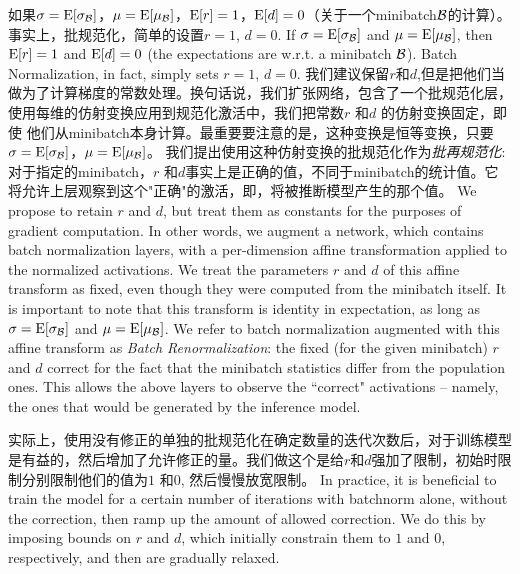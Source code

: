 如果$\sigma = \mathrm{E}[\sigma_{\mathcal{B}}]$，$\mu=\mathrm{E}[\mu_{\mathcal{B}}]$，$\mathrm{E}[r] = 1$，$\mathrm{E}[d] = 0$（关于一个minibatch$\mathcal{B}$的计算）。事实上，批规范化，简单的设置$r=1$, $d=0$.
If  $\sigma = \mathrm{E}[\sigma_{\mathcal{B}}]$ and $\mu=\mathrm{E}[\mu_{\mathcal{B}}]$, then $\mathrm{E}[r] = 1$ and $\mathrm{E}[d] = 0$  (the expectations are w.r.t. a minibatch $\mathcal{B}$). Batch Normalization, in fact, simply sets $r=1$, $d=0$.
我们建议保留$r$和$d$,但是把他们当做为了计算梯度的常数处理。换句话说，我们扩张网络，包含了一个批规范化层，使用每维的仿射变换应用到规范化激活中，我们把常数$r$ 和$d$ 的仿射变换固定，即使
他们从minibatch本身计算。最重要要注意的是，这种变换是恒等变换，只要$\sigma = \mathrm{E}[\sigma_{\mathcal{B}}]$，$\mu=\mathrm{E}[\mu_{\mathcal{B}}]$。
我们提出使用这种仿射变换的批规范化作为{\em 批再规范化}:对于指定的minibatch，$r$ 和$d$事实上是正确的值，不同于minibatch的统计值。它将允许上层观察到这个"正确"的激活，即，将被推断模型产生的那个值。
We propose to retain $r$ and $d$, but treat them as constants for the purposes of gradient computation. In other words, we augment a  network, which contains batch normalization layers, with a per-dimension affine transformation applied to the normalized activations. We treat the parameters $r$ and $d$ of this affine transform as fixed, even though they were computed from the minibatch itself. It is important to note that this transform  is identity in expectation, as long as  $\sigma = \mathrm{E}[\sigma_{\mathcal{B}}]$ and $\mu=\mathrm{E}[\mu_{\mathcal{B}}]$. We refer to batch normalization augmented with this affine transform as {\em Batch Renormalization}: the fixed (for the given minibatch) $r$ and $d$ correct for the fact that the minibatch statistics differ from the population ones. This allows the above layers to observe the ``correct"  activations -- namely, the ones that would be generated by the inference model.

实际上，使用没有修正的单独的批规范化在确定数量的迭代次数后，对于训练模型是有益的，然后增加了允许修正的量。我们做这个是给$r$和$d$强加了限制，初始时限制分别限制他们的值为$1$ 和$0$, 然后慢慢放宽限制。
In practice, it is beneficial to train the model for a certain number of iterations with batchnorm alone, without the correction, then ramp up the amount of allowed correction. We do this by imposing bounds on $r$ and $d$, which initially constrain them to $1$ and $0$, respectively, and then are gradually relaxed.

